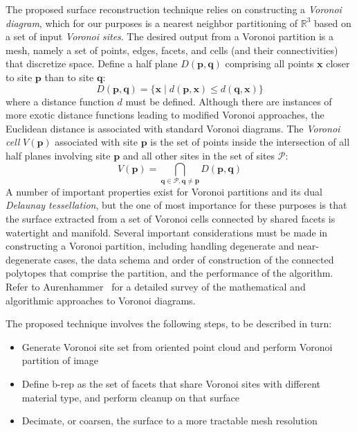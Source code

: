 The proposed surface reconstruction technique relies on constructing a \textit{Voronoi diagram}, which for our purposes is a nearest neighbor partitioning of $\mathbb{R}^3$ based on a set of input \textit{Voronoi sites}. The desired output from a Voronoi partition is a mesh, namely a set of points, edges, facets, and cells (and their connectivities) that discretize space. Define a half plane $D(\bm{p},\bm{q})$ comprising all points $\bm{x}$ closer to site $\bm{p}$ than to site $\bm{q}$:
\begin{equation}
D(\bm{p},\bm{q}) = \{\bm{x} \mid d(\bm{p},\bm{x}) \leq d(\bm{q},\bm{x})\}
\end{equation}
where a distance function $d$ must be defined. Although there are instances of more exotic distance functions leading to modified Voronoi approaches, the Euclidean distance is associated with standard Voronoi diagrams. The \textit{Voronoi cell} $V(\bm{p})$ associated with site $\bm{p}$ is the set of points inside the intersection of all half planes involving site $\bm{p}$ and all other sites in the set of sites $\mathcal{P}$:
\begin{equation}
V(\bm{p}) = \bigcap \limits_{\bm{q} \in \mathcal{P}, \bm{q} \neq \bm{p}} D(\bm{p},\bm{q})
\end{equation}
A number of important properties exist for Voronoi partitions and its dual \textit{Delaunay tessellation}, but the one of most importance for these purposes is that the surface extracted from a set of Voronoi cells connected by shared facets is watertight and manifold. Several important considerations must be made in constructing a Voronoi partition, including handling degenerate and near-degenerate cases, the data schema and order of construction of the connected polytopes that comprise the partition, and the
performance of the algorithm. Refer to Aurenhammer~\cite{aurenhammer_1991} for a detailed survey of the mathematical and algorithmic approaches to Voronoi diagrams.

The proposed technique involves the following steps, to be described in turn:
\begin{itemize}[noitemsep]
\item Generate Voronoi site set from oriented point cloud and perform Voronoi partition of image
\item Define b-rep as the set of facets that share Voronoi sites with different material type, and perform cleanup on that surface
\item Decimate, or coarsen, the surface to a more tractable mesh resolution
\end{itemize}

